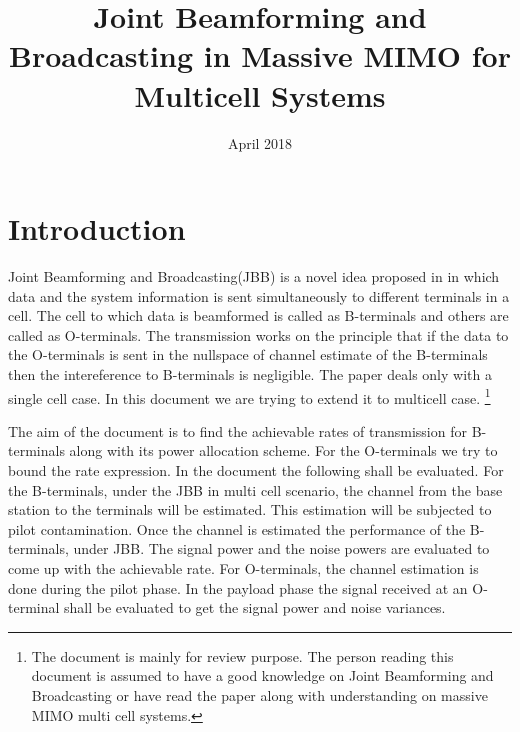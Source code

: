 \documentclass[10pt, a4paper, twoside,fleqn]{article}
\title{Joint Beamforming and Broadcasting in Massive MIMO for Multicell Systems}
\author{}
\date{April 2018}
\begin{document}
\maketitle
 
\section{Introduction}
	Joint Beamforming and Broadcasting(JBB) is a novel idea proposed in \cite{bib:jbb} in which data and the system information is sent simultaneously to different terminals in a cell. The cell to which data is beamformed is called as B-terminals and others are called as O-terminals. The transmission works on the principle that if the data to the O-terminals is sent in the nullspace of channel estimate of the B-terminals then the intereference to B-terminals is negligible. The paper \cite{bib:jbb} deals only with a single cell case. In this document we are trying to extend it to multicell case.
\footnote{The document is mainly for review purpose. The person reading this document is assumed to have a good knowledge on Joint Beamforming and Broadcasting or have read the paper \cite{bib:jbb} along with understanding on massive MIMO multi cell systems.}
	
	The aim of the document is to find the achievable rates of transmission for B-terminals along with its power allocation scheme. For the O-terminals we try to bound the rate expression. In the document the following shall be evaluated. For the B-terminals, under the JBB in multi cell scenario, the channel from the base station to the terminals will be estimated. This estimation will be subjected to pilot contamination. Once the channel is estimated the performance of the B-terminals, under JBB. The signal power and the noise powers are evaluated to come up with the achievable rate. For O-terminals, the channel estimation is done during the pilot phase. In the payload phase the signal received at an O-terminal shall be evaluated to get the signal power and noise variances.
\end{document}

